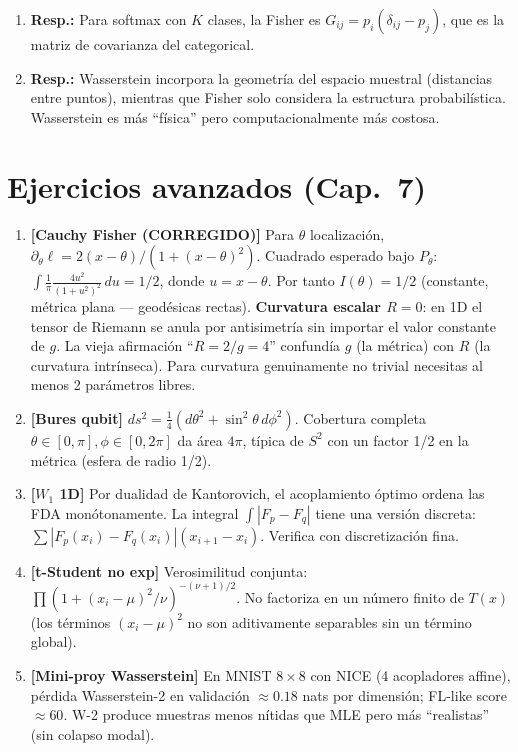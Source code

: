 \begin{enumerate}
	\item \textbf{Resp.:} Para softmax con $K$ clases, la Fisher es $G_{ij} = p_i(\delta_{ij} - p_j)$, que es la matriz de covarianza del categorical.
	\item \textbf{Resp.:} Wasserstein incorpora la geometría del espacio muestral (distancias entre puntos), mientras que Fisher solo considera la estructura probabilística.  Wasserstein es más ``física'' pero computacionalmente más costosa.
\end{enumerate}

\section*{Ejercicios avanzados (Cap.~7)}
\begin{enumerate}
	\item \textbf{[Cauchy Fisher (CORREGIDO)]} Para $\theta$ localizaci\'on, $\partial_\theta\ell = 2(x-\theta)/(1+(x-\theta)^2)$. Cuadrado esperado bajo $P_\theta$: $\int \frac{1}{\pi}\frac{4u^2}{(1+u^2)^2}\,du=1/2$, donde $u=x-\theta$. Por tanto $I(\theta)=1/2$ (constante, métrica plana — geodésicas rectas). \textbf{Curvatura escalar $R=0$}: en 1D el tensor de Riemann se anula por antisimetría sin importar el valor constante de $g$. La vieja afirmación ``$R=2/g=4$'' confundía $g$ (la métrica) con $R$ (la curvatura intrínseca). Para curvatura genuinamente no trivial necesitas al menos 2 parámetros libres.
	\item \textbf{[Bures qubit]} $ds^2=\tfrac{1}{4}(d\theta^2+\sin^2\theta\,d\phi^2)$. Cobertura completa $\theta\in[0,\pi],\phi\in[0,2\pi]$ da \'area $4\pi$, t\'ipica de $S^2$ con un factor 1/2 en la m\'etrica (esfera de radio 1/2).
	\item \textbf{[$W_1$ 1D]} Por dualidad de Kantorovich, el acoplamiento \'optimo ordena las FDA mon\'otonamente. La integral $\int|F_p-F_q|$ tiene una versi\'on discreta: $\sum |F_p(x_i)-F_q(x_i)|(x_{i+1}-x_i)$. Verifica con discretizaci\'on fina.
	\item \textbf{[t-Student no exp]} Verosimilitud conjunta: $\prod(1+(x_i-\mu)^2/\nu)^{-(\nu+1)/2}$. No factoriza en un n\'umero finito de $T(x)$ (los t\'erminos $(x_i-\mu)^2$ no son aditivamente separables sin un t\'ermino global).
	\item \textbf{[Mini-proy Wasserstein]} En MNIST $8\times 8$ con NICE (4 acopladores affine), p\'erdida Wasserstein-2 en validaci\'on $\approx 0.18$ nats por dimensi\'on; FL-like score $\approx 60$. W-2 produce muestras menos n\'itidas que MLE pero m\'as ``realistas'' (sin colapso modal).
\end{enumerate}

